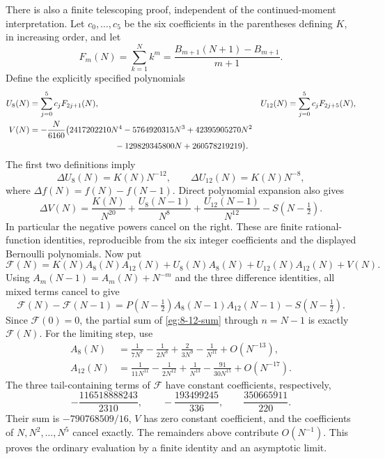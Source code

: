 There is also a finite telescoping proof, independent of the
continued-moment interpretation. Let $c_0,\ldots,c_5$ be the six
coefficients in the parentheses defining $K$, in increasing order,
and let
\[
 F_m(N)=\sum_{k=1}^N k^m
       =\frac{B_{m+1}(N+1)-B_{m+1}}{m+1}.
\]
Define the explicitly specified polynomials
\begin{align*}
 U_8(N)&=\sum_{j=0}^5c_jF_{2j+1}(N),&
 U_{12}(N)&=\sum_{j=0}^5c_jF_{2j+5}(N),\\
 V(N)&=-\frac{N}{6160}\bigl(
 2417202210N^4-5764920315N^3+42395905270N^2\notag\\
 &\hspace{36mm}-129829345800N+260578219219\bigr).
\end{align*}
The first two definitions imply
\[
 \Delta U_8(N)=K(N)N^{-12},\qquad
 \Delta U_{12}(N)=K(N)N^{-8},
\]
where $\Delta f(N)=f(N)-f(N-1)$. Direct polynomial expansion also
gives
\begin{equation}\label{eg:V-difference}
 \Delta V(N)=\frac{K(N)}{N^{20}}+
      \frac{U_8(N-1)}{N^8}+\frac{U_{12}(N-1)}{N^{12}}
                         -S(N-\tfrac12).
\end{equation}
In particular the negative powers cancel on the right. These are
finite rational-function identities, reproducible from the six
integer coefficients and the displayed Bernoulli polynomials.
Now put
\[
 \mathcal F(N)=K(N)A_8(N)A_{12}(N)
                 +U_8(N)A_8(N)+U_{12}(N)A_{12}(N)+V(N).
\]
Using $A_m(N-1)=A_m(N)+N^{-m}$ and the three difference identities,
all mixed terms cancel to give
\[
 \mathcal F(N)-\mathcal F(N-1)
 =P(N-\tfrac12)A_8(N-1)A_{12}(N-1)-S(N-\tfrac12).
\]
Since $\mathcal F(0)=0$, the partial sum of
\eqref{eg:8-12-sum} through $n=N-1$ is exactly $\mathcal F(N)$.
For the limiting step, use
\begin{align*}
 A_8(N)&=\frac1{7N^7}-\frac1{2N^8}+\frac2{3N^9}
                                      -\frac1{N^{11}}+O(N^{-13}),\\
 A_{12}(N)&=\frac1{11N^{11}}-\frac1{2N^{12}}+\frac1{N^{13}}
                                 -\frac{91}{30N^{15}}+O(N^{-17}).
\end{align*}
The three tail-containing terms of $\mathcal F$ have constant
coefficients, respectively,
\[
       -\frac{116518888243}{2310},\qquad
       -\frac{193499245}{336},\qquad
        \frac{350665911}{220}.
\]
Their sum is $-790768509/16$, $V$ has zero constant coefficient,
and the coefficients of $N,N^2,\ldots,N^5$ cancel exactly.
The remainders above contribute $O(N^{-1})$. This proves the
ordinary evaluation by a finite identity and an asymptotic limit.

